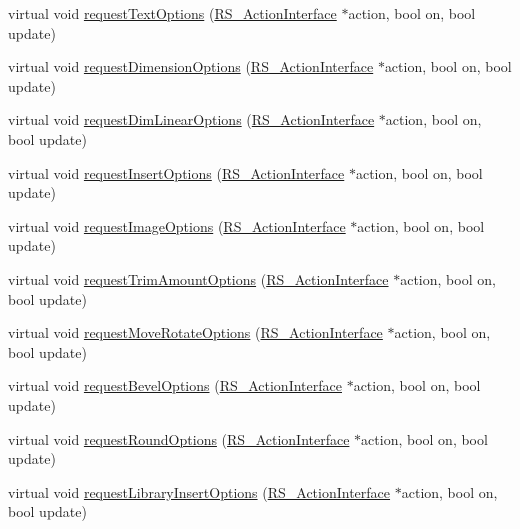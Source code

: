 \begin{DoxyCompactItemize}
\item 
virtual void \hyperlink{classQG__DialogFactory_a1df1a6e52715fbffd283ae1dcf8da949}{request\-Text\-Options} (\hyperlink{classRS__ActionInterface}{R\-S\-\_\-\-Action\-Interface} $\ast$action, bool on, bool update)
\item 
virtual void \hyperlink{classQG__DialogFactory_ade7d5b7a8cc3e060b47bf66a68b5e7c2}{request\-Dimension\-Options} (\hyperlink{classRS__ActionInterface}{R\-S\-\_\-\-Action\-Interface} $\ast$action, bool on, bool update)
\item 
virtual void \hyperlink{classQG__DialogFactory_aab49816d5cf7c57010f3d1d43fe26ca0}{request\-Dim\-Linear\-Options} (\hyperlink{classRS__ActionInterface}{R\-S\-\_\-\-Action\-Interface} $\ast$action, bool on, bool update)
\item 
virtual void \hyperlink{classQG__DialogFactory_ad7e03c83b644d7483e08a3d2a9ea2bd6}{request\-Insert\-Options} (\hyperlink{classRS__ActionInterface}{R\-S\-\_\-\-Action\-Interface} $\ast$action, bool on, bool update)
\item 
virtual void \hyperlink{classQG__DialogFactory_a61db07e5e28c6d89cd4337098cf7936f}{request\-Image\-Options} (\hyperlink{classRS__ActionInterface}{R\-S\-\_\-\-Action\-Interface} $\ast$action, bool on, bool update)
\item 
virtual void \hyperlink{classQG__DialogFactory_a9f4d6563bbb71f2872760328253323e3}{request\-Trim\-Amount\-Options} (\hyperlink{classRS__ActionInterface}{R\-S\-\_\-\-Action\-Interface} $\ast$action, bool on, bool update)
\item 
virtual void \hyperlink{classQG__DialogFactory_a2479baa7f8734b3da3fc67daa06a6e68}{request\-Move\-Rotate\-Options} (\hyperlink{classRS__ActionInterface}{R\-S\-\_\-\-Action\-Interface} $\ast$action, bool on, bool update)
\item 
virtual void \hyperlink{classQG__DialogFactory_a322230d7fd4f1860bc1f3f6a4aed5020}{request\-Bevel\-Options} (\hyperlink{classRS__ActionInterface}{R\-S\-\_\-\-Action\-Interface} $\ast$action, bool on, bool update)
\item 
virtual void \hyperlink{classQG__DialogFactory_ab031fb1f853b2c1448b5aca3303d085c}{request\-Round\-Options} (\hyperlink{classRS__ActionInterface}{R\-S\-\_\-\-Action\-Interface} $\ast$action, bool on, bool update)
\item 
virtual void \hyperlink{classQG__DialogFactory_ae9b65826d020aa6c03f51c0da65d1f5f}{request\-Library\-Insert\-Options} (\hyperlink{classRS__ActionInterface}{R\-S\-\_\-\-Action\-Interface} $\ast$action, bool on, bool update)
\end{DoxyCompactItemize}
